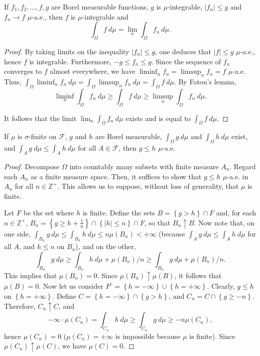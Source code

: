 \begin{thrm}\label{theorem:Dominated
Convergence} If \(f_1,f_2,\dots,f,g\) are Borel measurable functions, \(g\) is
\(\mu\)-integrable, \(|f_n|\leq g\)  and \(f_n\to f\) \(\mu\)-a.e., then \(f\)
is \(\mu\)-integrable and
	\[\int_{\Omega}f~d\mu=\lim_n\int_{\Omega}f_n~d\mu.\]
\end{thrm}
\begin{proof} By taking limits on the inequality \(|f_n|\leq g\), one deduces
that \(|f|\leq g\) \(\mu\)-a.e., hence \(f\) is integrable. Furthermore,
\(-g\leq f_n\leq g\). Since the sequence of \(f_n\) converges to \(f\) almost
everywhere, we have \(\liminf_nf_n=\limsup_nf_n=f\) \(\mu\)-a.e. Thus,
\(\int_{\Omega}\liminf_nf_n~d\mu=\int_{\Omega}\limsup_nf_n~d\mu=\int_{\Omega}f~d\mu\).
By Fatou's lemma,
	\[\liminf_n\int_{\Omega}f_n~d\mu\geq\int_{\Omega}f~d\mu\geq\limsup_n\int_{\Omega}f_n~d\mu.\]
	
	It follows that the limit \(\lim_n\int_{\Omega}f_n~d\mu\) exists and is
equal to \(\int_{\Omega}f~d\mu\).
\end{proof}
\begin{thrm}\label{theorem:inequality of integrals implies inequality of
functions} If \(\mu\) is \(\sigma\)-finite on \(\mathcal{F}\), \(g\) and \(h\) are Borel
measurable, \(\int_{\Omega}g~d\mu\) and \(\int_{\Omega}h~d\mu\) exist, and
\(\int_{A}g~d\mu\leq\int_{A}h~d\mu\) for all \(A\in\mathcal{F}\), then \(g\leq h\)
\(\mu\)-a.e.
\end{thrm}
\begin{proof} Decompose \(\Omega\) into countably many subsets with finite
measure \(A_n\). Regard each \(A_n\) as a finite measure space. Then, it
suffices to show that \(g\leq h\) \(\mu\)-a.e. in \(A_n\) for all \(n\in\mathbb{Z}^+\).
This allows us to suppose, without loss of generality, that \(\mu\) is finite.
	
	Let \(F\) be the set where \(h\) is finite. Define the sets
\(B=\left\{g>h\right\}\cap F\)  and, for
each \(n\in\mathbb{Z}^+\),
\(B_n=\left\{g\geq h+\frac{1}{n}\right\}\cap\left\{\left|h\right|\leq n\right\}\cap F\),
so that \(B_n\uparrow B\). Now note that, on one side,
\(\int_{B_n}g~d\mu\leq\int_{B_n}h~d\mu\leq n\mu(B_n)<+\infty\) (because \(\int_{A}g~d\mu\leq\int_{A}h~d\mu\) for all \(A\), and \(h\leq n\) on \(B_n\)), and on the
other,
	\[\int_{B_{n}}g~d\mu\geq\int_{B_n}h~d\mu+\mu(B_n)/n\geq\int_{B_n}g~d\mu+\mu(B_n)/n.\]
This implies that \(\mu(B_n)=0\). Since \(\mu(B_n)\uparrow\mu(B)\), it follows
that \(\mu(B)=0\).  Now let us consider
\(F^c=\left\{h=-\infty\right\}\cup\left\{h=+\infty\right\}\).
Clearly, \(g\leq h\) on \(\left\{h=+\infty\right\}\).
Define \(C=\left\{h=-\infty\right\}\cap\left\{g>h\right\}\), and
\(C_{n}=C\cap\left\{g\geq -n\right\}\). Therefore,
\(C_n\uparrow C\), and
	\[-\infty\cdot\mu(C_{n})=\int_{C_n}h~d\mu\geq\int_{C_n}g~d\mu\geq -n\mu(C_n),\]
	hence \(\mu(C_n)=0\) (\(\mu(C_n)=+\infty\) is impossible because \(\mu\) is finite). Since \(\mu(C_n)\uparrow\mu(C)\), we have \(\mu(C)=0\).
\end{proof}
